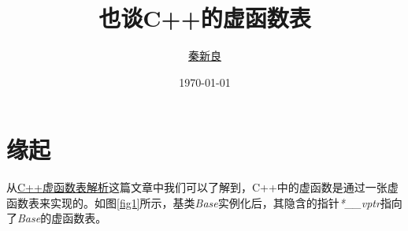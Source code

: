 \documentclass[a4paper, 11pt, titlepage]{article}
\newcommand*{\TitleFont}{\usefont{\encodingdefault}{\rmdefault}{b}{n}\fontsize{32}{40}\selectfont}
\begin{document}
\setlength{\parindent}{2em}

\title{\TitleFont 也谈C++的虚函数表}
\author{\href{mailto:foolswonder@gmail.com}{秦新良}}
\date{\today}

\maketitle

\tableofcontents
\newpage

\section{缘起}
从\href{http://blog.csdn.net/haoel/article/details/1948051}{C++虚函数表解析}这篇文章中我们可以了解到，C++中的虚函数是通过一张虚函数表来实现的。如图\ref{fig1}所示，基类\emph{Base}实例化后，其隐含的指针\emph{*\_\_vptr}指向了\emph{Base}的虚函数表。
\end{document}
